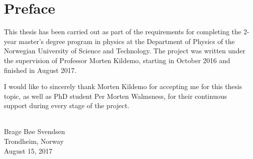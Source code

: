 \section*{\Huge Preface}

This thesis has been carried out as part of the requirements for completing the 2-year master's degree program in physics at the Department of Physics of the Norwegian University of Science and Technology. The project was written under the supervision of Professor Morten Kildemo, starting in October 2016 and finished in August 2017.

I would like to sincerely thank Morten Kildemo for accepting me for this thesis topic, as well as PhD student Per Morten Walmsness, for their continuous support during every stage of the project.
\\
\\
\begin{minipage}{0.95\textwidth}
\begin{flushright}
Brage Bøe Svendsen \\
Trondheim, Norway \\
August 15, 2017
\end{flushright}
\end{minipage}\\[4cm]


\listoftodos[Notes]

\clearpage